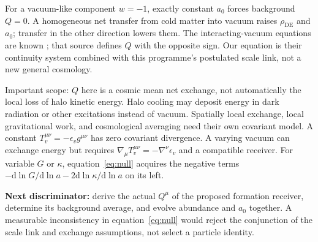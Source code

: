 \documentclass[11pt]{article}
\newcommand{\dd}{\mathrm d}
\newcommand{\DE}{\mathrm{DE}}
\begin{document}
For a vacuum-like component $w=-1$, exactly constant $a_0$ forces background
$Q=0$. A homogeneous net transfer from cold matter into vacuum raises
$\rho_\DE$ and $a_0$; transfer in the other direction lowers them.
The interacting-vacuum equations are known \cite{wands}; that source defines
$Q$ with the opposite sign. Our equation is their continuity system combined
with this programme's postulated scale link, not a new general cosmology.

Important scope: $Q$ here is a cosmic mean net exchange, not automatically
the local loss of halo kinetic energy. Halo cooling may deposit energy in
dark radiation or other excitations instead of vacuum. Spatially local
exchange, local gravitational work, and cosmological averaging need their own
covariant model. A constant $T_v^{\mu\nu}=-\epsilon_v g^{\mu\nu}$ has zero
covariant divergence. A varying vacuum can exchange energy but requires
$\nabla_\mu T_v^{\mu\nu}=-\nabla^\nu\epsilon_v$ and a compatible receiver.
For variable $G$ or $\kappa$, equation~\eqref{eq:null} acquires the negative
terms $-\dd\ln G/\dd\ln a-2\dd\ln\kappa/\dd\ln a$ on its left.

\textbf{Next discriminator:} derive the actual $Q^\mu$ of the proposed
formation receiver, determine its background average, and evolve abundance
and $a_0$ together. A measurable inconsistency in equation~\eqref{eq:null}
would reject the conjunction of the scale link and exchange assumptions,
not select a particle identity.
\end{document}
